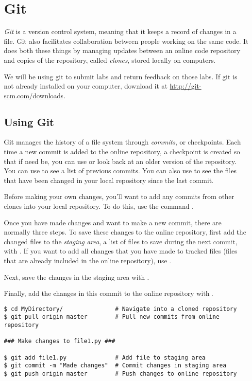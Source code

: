 \section*{Git} %
\emph{Git} is a version control system, meaning that it keeps a record of changes in a file. 
Git also facilitates collaboration between people working on the same code.
It does both these things by managing updates between an online code repository and copies of the repository, called \emph{clones}, stored locally on computers.

We will be using git to submit labs and return feedback on those labs. If git is not already installed on your computer, download it at \url{http://git-scm.com/downloads}.

\subsection*{Using Git} %
Git manages the history of a file system through \emph{commits}, or checkpoints.
Each time a new commit is added to the online repository, a checkpoint is created so that if need be, you can use or look back at an older version of the repository.
You can use  to see a list of previous commits.
You can also use  to see the files that have been changed in your local repository since the last commit.

Before making your own changes, you'll want to add any commits from other clones into your local repository.
To do this, use the command .

Once you have made changes and want to make a new commit, there are normally three steps.
To save these changes to the online repository, first add the changed files to the \emph{staging area}, a list of files to save during the next commit, with . 
If you want to add all changes that you have made to tracked files (files that are already included in the online repository), use .

Next, save the changes in the staging area with .

Finally, add the changes in this commit to the online repository with .

\begin{lstlisting}
$ cd MyDirectory/				# Navigate into a cloned repository
$ git pull origin master		# Pull new commits from online repository

### Make changes to file1.py ###

$ git add file1.py				# Add file to staging area
$ git commit -m "Made changes" 	# Commit changes in staging area
$ git push origin master 		# Push changes to online repository
\end{lstlisting}


